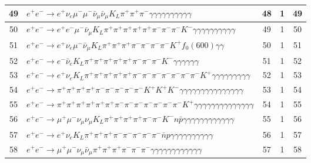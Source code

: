 \documentclass[landscape]{article}
\begin{document}
\begin{table}[htbp!]
\begin{tabular}{|c|>{\centering}p{18cm}|c|c|c|}
49 & $ e^{+} e^{-} \rightarrow e^{+} \nu_{e} \mu^{-} \mu^{-} \bar{\nu}_{\mu} \bar{\nu}_{\mu} K_{L} \pi^{+} \pi^{+} \pi^{-} \gamma \gamma \gamma \gamma \gamma \gamma \gamma \gamma \gamma \gamma $ & 48 & 1 & 49 \\
\hline
50 & $ e^{+} e^{-} \rightarrow e^{+} e^{-} \mu^{-} \bar{\nu}_{\mu} K_{L} \pi^{+} \pi^{+} \pi^{+} \pi^{+} \pi^{+} \pi^{-} \pi^{-} \pi^{-} K^{-} \gamma \gamma \gamma \gamma \gamma \gamma \gamma \gamma \gamma \gamma $ & 49 & 1 & 50 \\
\hline
51 & $ e^{+} e^{-} \rightarrow e^{+} \nu_{e} \mu^{-} \bar{\nu}_{\mu} K_{L} \pi^{+} \pi^{+} \pi^{+} \pi^{-} \pi^{-} \pi^{-} \pi^{-} K^{+} f_{0}(600) \gamma \gamma $ & 50 & 1 & 51 \\
\hline
52 & $ e^{+} e^{-} \rightarrow e^{-} \bar{\nu}_{e} K_{L} \pi^{+} \pi^{+} \pi^{+} \pi^{+} \pi^{+} \pi^{-} \pi^{-} \pi^{-} K^{-} \gamma \gamma \gamma \gamma \gamma \gamma $ & 51 & 1 & 52 \\
\hline
53 & $ e^{+} e^{-} \rightarrow e^{+} \nu_{e} K_{L} \pi^{+} \pi^{+} \pi^{+} \pi^{+} \pi^{+} \pi^{-} \pi^{-} \pi^{-} \pi^{-} \pi^{-} \pi^{-} \pi^{-} K^{+} \gamma \gamma \gamma \gamma \gamma \gamma \gamma \gamma \gamma $ & 52 & 1 & 53 \\
\hline
54 & $ e^{+} e^{-} \rightarrow \pi^{+} \pi^{+} \pi^{+} \pi^{+} \pi^{-} \pi^{-} \pi^{-} \pi^{-} \pi^{-} K^{+} K^{+} K^{-} \gamma \gamma \gamma \gamma \gamma \gamma \gamma \gamma \gamma \gamma \gamma \gamma \gamma \gamma \gamma $ & 53 & 1 & 54 \\
\hline
55 & $ e^{+} e^{-} \rightarrow \pi^{+} \pi^{+} \pi^{+} \pi^{+} \pi^{+} \pi^{+} \pi^{-} \pi^{-} \pi^{-} \pi^{-} \pi^{-} \pi^{-} \pi^{-} K^{+} \gamma \gamma \gamma \gamma \gamma \gamma \gamma \gamma \gamma \gamma \gamma \gamma \gamma \gamma $ & 54 & 1 & 55 \\
\hline
56 & $ e^{+} e^{-} \rightarrow \mu^{+} \mu^{-} \nu_{\mu} \nu_{\mu} K_{L} \pi^{+} \pi^{+} \pi^{+} \pi^{+} \pi^{-} \pi^{-} K^{-} n \bar{p} \gamma \gamma \gamma \gamma \gamma \gamma \gamma \gamma \gamma \gamma \gamma \gamma $ & 55 & 1 & 56 \\
\hline
57 & $ e^{+} e^{-} \rightarrow e^{+} \nu_{e} K_{L} \pi^{+} \pi^{+} \pi^{+} \pi^{-} \pi^{-} \pi^{-} \pi^{-} \pi^{-} \bar{n} p \gamma \gamma \gamma \gamma \gamma \gamma \gamma \gamma \gamma \gamma $ & 56 & 1 & 57 \\
\hline
58 & $ e^{+} e^{-} \rightarrow \mu^{+} \mu^{-} \nu_{\mu} \bar{\nu}_{\mu} \pi^{+} \pi^{+} \pi^{+} \pi^{-} \pi^{-} \pi^{-} \gamma \gamma \gamma \gamma \gamma \gamma \gamma \gamma \gamma \gamma \gamma \gamma $ & 57 & 1 & 58 \\

\end{tabular}
\end{table}
\end{document}
